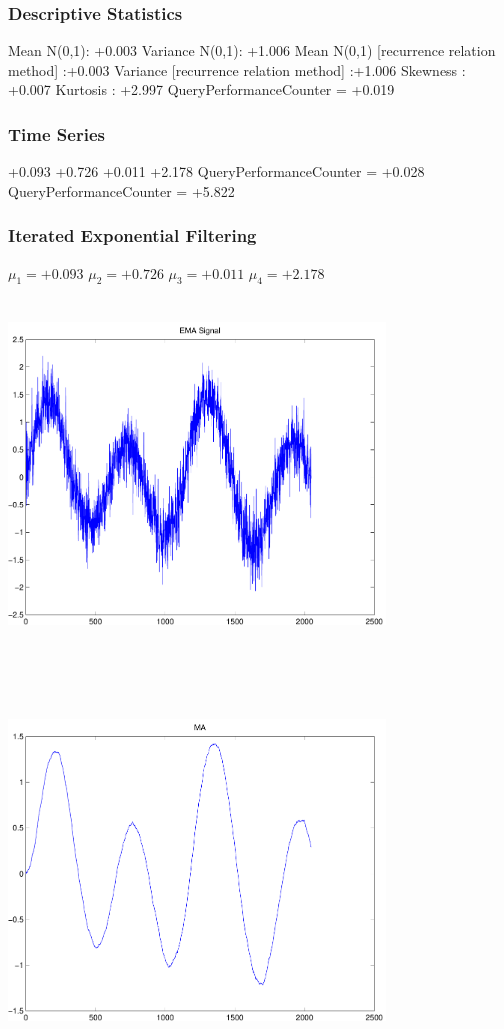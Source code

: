 \documentclass[9pt]{article}
\theoremstyle{plain}
\theoremstyle{definition}
\theoremstyle{remark}
\numberwithin{equation}{section}
\begin{document}
\subsubsection{Descriptive Statistics}
Mean N(0,1): +0.003
Variance N(0,1): +1.006
Mean N(0,1) [recurrence relation method] :+0.003
Variance [recurrence relation method] :+1.006
Skewness : +0.007
Kurtosis : +2.997
QueryPerformanceCounter  =  +0.019
\subsubsection{Time Series }
+0.093
+0.726
+0.011
+2.178
QueryPerformanceCounter  =  +0.028
QueryPerformanceCounter  =  +5.822
\subsubsection{Iterated Exponential Filtering }
$\mu_1 =+0.093$
$\mu_2 =+0.726$
$\mu_3 =+0.011$
$\mu_4 =+2.178$
\includegraphics[width=10.0cm,height=10.0cm]{EMA_signal.pdf}

\includegraphics[width=10.0cm,height=10.0cm]{MA.pdf}
\end{document}

